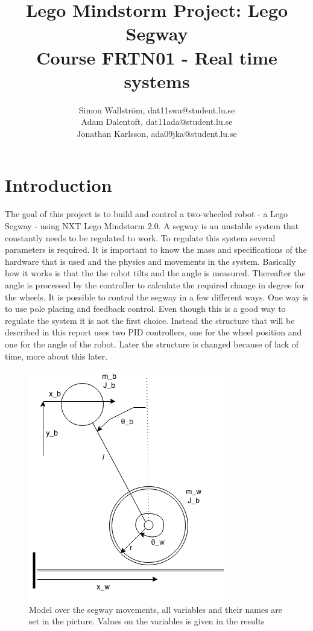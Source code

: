 \documentclass[a4paper]{article}
\title{Lego Mindstorm Project: Lego Segway\\
Course FRTN01 - Real time systems}
\author{Simon Wallström, dat11swa@student.lu.se\\
Adam Dalentoft, dat11ada@student.lu.se\\
Jonathan Karlsson, ada09jka@student.lu.se}
\begin{document}

\maketitle
\thispagestyle{empty}
\newpage
\setcounter{page}{1}
\tableofcontents
\newpage
\section{Introduction}
The goal of this project is to build and control a two-wheeled robot - a Lego Segway - using NXT Lego Mindstorm 2.0. A segway is an unstable system that constantly needs to be regulated to work. To regulate this system several parameters is required. It is important to know the mass and specifications of the hardware that is used and the physics and movements in the system. Basically how it works is that the the robot tilts and the angle is measured. Thereafter the angle is processed by the controller to calculate the required change in degree for the wheels. It is possible to control the segway in a few different ways. One way is to use pole placing and feedback control. Even though this is a good way to regulate the system it is not the first choice. Instead the structure that will be described in this report uses two PID controllers, one for the wheel position and one for the angle of the robot. Later the structure is changed because of lack of time, more about this later.\\

\begin{figure}[H]
 \centering
\includegraphics[scale=0.8]{pic/segway.png}
\caption{Model over the segway movements, all variables and their names are set in the picture. Values on the variables is given in the results }
\end{figure}
\end{document}
